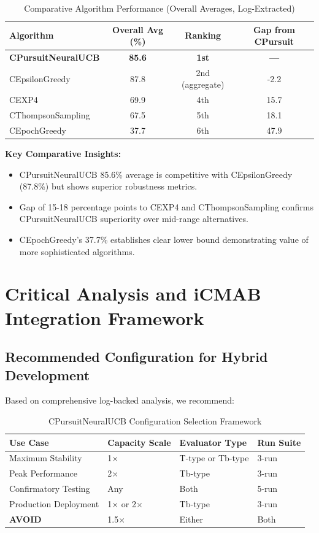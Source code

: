 \documentclass[12pt,a4paper]{article}
\newcommand{\performance}[1]{\textcolor{performancecolor}{\textbf{#1}}}
\newcommand{\critical}[1]{\textcolor{criticalcolor}{\textbf{#1}}}
\begin{document}
\begin{table}[H]
\centering
\caption{Comparative Algorithm Performance (Overall Averages, Log-Extracted)}
\begin{tabular}{|l|c|c|c|}
\hline
\textbf{Algorithm} & \textbf{Overall Avg (\%)} & \textbf{Ranking} & \textbf{Gap from CPursuit} \\
\hline
\hline
\performance{CPursuitNeuralUCB} & \performance{\textbf{85.6}} & \performance{\textbf{1st}} & \performance{\textbf{—}} \\
CEpsilonGreedy & 87.8 & 2nd (aggregate) & -2.2 \\
CEXP4 & 69.9 & 4th & 15.7 \\
CThompsonSampling & 67.5 & 5th & 18.1 \\
CEpochGreedy & 37.7 & 6th & 47.9 \\
\hline
\end{tabular}
\end{table}

\textbf{Key Comparative Insights:}
\begin{itemize}
\item CPursuitNeuralUCB 85.6\% average is competitive with CEpsilonGreedy (87.8\%) but shows superior robustness metrics.
\item Gap of 15-18 percentage points to CEXP4 and CThompsonSampling confirms CPursuitNeuralUCB superiority over mid-range alternatives.
\item CEpochGreedy's 37.7\% establishes clear lower bound demonstrating value of more sophisticated algorithms.
\end{itemize}

\newpage
\section{Critical Analysis and iCMAB Integration Framework}

\subsection{Recommended Configuration for Hybrid Development}

Based on comprehensive log-backed analysis, we recommend:

\begin{table}[H]
\centering
\caption{CPursuitNeuralUCB Configuration Selection Framework}
\begin{tabular}{|l|l|l|l|}
\hline
\textbf{Use Case} & \textbf{Capacity Scale} & \textbf{Evaluator Type} & \textbf{Run Suite} \\
\hline
\hline
Maximum Stability & 1$\times$ & T-type or Tb-type & 3-run \\
Peak Performance & 2$\times$ & Tb-type & 3-run \\
Confirmatory Testing & Any & Both & 5-run \\
Production Deployment & 1$\times$ or 2$\times$ & Tb-type & 3-run \\
\critical{AVOID} & 1.5$\times$ & Either & Both \\
\hline
\end{tabular}
\end{table}
\end{document}
